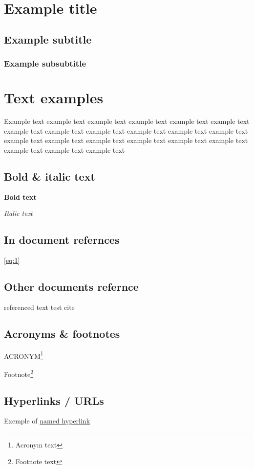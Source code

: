 \section{Example title}
\subsection{Example subtitle}
\subsubsection{Example subsubtitle}


\section{Text examples}
Example text example text example text example text example text example text example text
example text example text example text example text example text example text example text
example text example text example text example text example text example text example text


\subsection{Bold \& italic text}
\textbf{Bold text}

\textit{Italic text}

\subsection{In document refernces}
\autoref{eq:1}

\subsection{Other documents refernce}
referenced text\cite{examplewebsite}
test cite \cite{dirac}


\subsection{Acronyms \& footnotes}

ACRONYM\footnote{Acronym text}

Footnote\footnote{Footnote text}

\subsection{Hyperlinks / URLs}
Exemple of \href{https://example.com}{named hyperlink}

